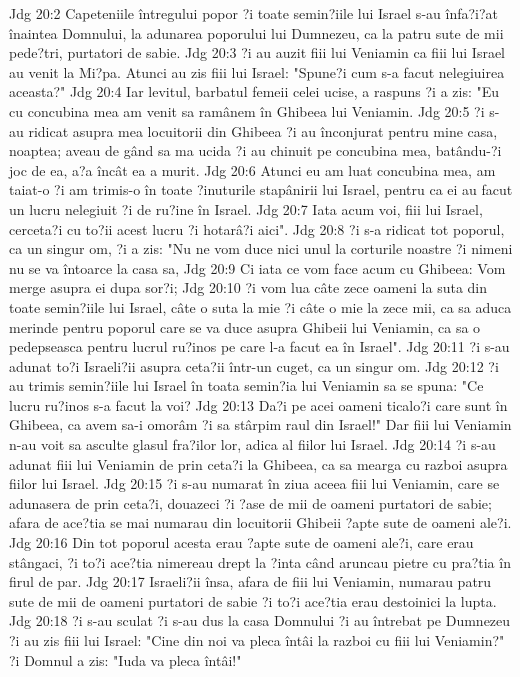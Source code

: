 Jdg 20:2  Capeteniile întregului popor ?i toate semin?iile lui Israel s-au înfa?i?at înaintea Domnului, la adunarea poporului lui Dumnezeu, ca la patru sute de mii pede?tri, purtatori de sabie.
Jdg 20:3  ?i au auzit fiii lui Veniamin ca fiii lui Israel au venit la Mi?pa. Atunci au zis fiii lui Israel: "Spune?i cum s-a facut nelegiuirea aceasta?"
Jdg 20:4  Iar levitul, barbatul femeii celei ucise, a raspuns ?i a zis: "Eu cu concubina mea am venit sa ramânem în Ghibeea lui Veniamin.
Jdg 20:5  ?i s-au ridicat asupra mea locuitorii din Ghibeea ?i au înconjurat pentru mine casa, noaptea; aveau de gând sa ma ucida ?i au chinuit pe concubina mea, batându-?i joc de ea, a?a încât ea a murit.
Jdg 20:6  Atunci eu am luat concubina mea, am taiat-o ?i am trimis-o în toate ?inuturile stapânirii lui Israel, pentru ca ei au facut un lucru nelegiuit ?i de ru?ine în Israel.
Jdg 20:7  Iata acum voi, fiii lui Israel, cerceta?i cu to?ii acest lucru ?i hotarâ?i aici".
Jdg 20:8  ?i s-a ridicat tot poporul, ca un singur om, ?i a zis: "Nu ne vom duce nici unul la corturile noastre ?i nimeni nu se va întoarce la casa sa,
Jdg 20:9  Ci iata ce vom face acum cu Ghibeea: Vom merge asupra ei dupa sor?i;
Jdg 20:10  ?i vom lua câte zece oameni la suta din toate semin?iile lui Israel, câte o suta la mie ?i câte o mie la zece mii, ca sa aduca merinde pentru poporul care se va duce asupra Ghibeii lui Veniamin, ca sa o pedepseasca pentru lucrul ru?inos pe care l-a facut ea în Israel".
Jdg 20:11  ?i s-au adunat to?i Israeli?ii asupra ceta?ii într-un cuget, ca un singur om.
Jdg 20:12  ?i au trimis semin?iile lui Israel în toata semin?ia lui Veniamin sa se spuna: "Ce lucru ru?inos s-a facut la voi?
Jdg 20:13  Da?i pe acei oameni ticalo?i care sunt în Ghibeea, ca avem sa-i omorâm ?i sa stârpim raul din Israel!" Dar fiii lui Veniamin n-au voit sa asculte glasul fra?ilor lor, adica al fiilor lui Israel.
Jdg 20:14  ?i s-au adunat fiii lui Veniamin de prin ceta?i la Ghibeea, ca sa mearga cu razboi asupra fiilor lui Israel.
Jdg 20:15  ?i s-au numarat în ziua aceea fiii lui Veniamin, care se adunasera de prin ceta?i, douazeci ?i ?ase de mii de oameni purtatori de sabie; afara de ace?tia se mai numarau din locuitorii Ghibeii ?apte sute de oameni ale?i.
Jdg 20:16  Din tot poporul acesta erau ?apte sute de oameni ale?i, care erau stângaci, ?i to?i ace?tia nimereau drept la ?inta când aruncau pietre cu pra?tia în firul de par.
Jdg 20:17  Israeli?ii însa, afara de fiii lui Veniamin, numarau patru sute de mii de oameni purtatori de sabie ?i to?i ace?tia erau destoinici la lupta.
Jdg 20:18  ?i s-au sculat ?i s-au dus la casa Domnului ?i au întrebat pe Dumnezeu ?i au zis fiii lui Israel: "Cine din noi va pleca întâi la razboi cu fiii lui Veniamin?" ?i Domnul a zis: "Iuda va pleca întâi!"
